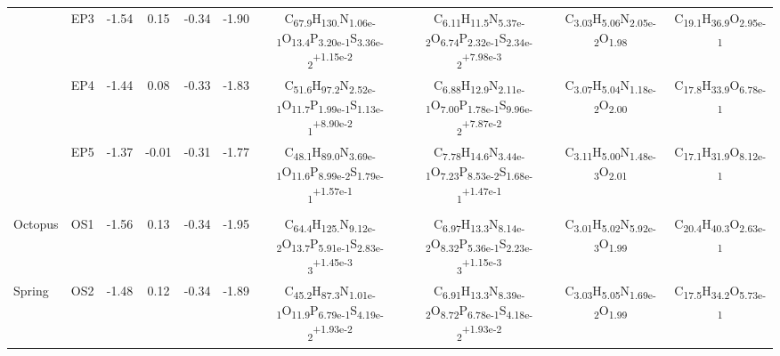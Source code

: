 {\begin{landscape}
\begin{table}
\begin{adjustbox}{width=600pt,keepaspectratio}
\begin{threeparttable}
\begin{tabular}{lccccccccc}
      & EP3   & -1.54 & 0.15  & -0.34 & -1.90 & C\textsubscript{67.9}H\textsubscript{130.}N\textsubscript{1.06e-1}O\textsubscript{13.4}P\textsubscript{3.20e-1}S\textsubscript{3.36e-2}\textsuperscript{+1.15e-2} & C\textsubscript{6.11}H\textsubscript{11.5}N\textsubscript{5.37e-2}O\textsubscript{6.74}P\textsubscript{2.32e-1}S\textsubscript{2.34e-2}\textsuperscript{+7.98e-3} & C\textsubscript{3.03}H\textsubscript{5.06}N\textsubscript{2.05e-2}O\textsubscript{1.98} & C\textsubscript{19.1}H\textsubscript{36.9}O\textsubscript{2.95e-1} \\
      & EP4   & -1.44 & 0.08  & -0.33 & -1.83 & C\textsubscript{51.6}H\textsubscript{97.2}N\textsubscript{2.52e-1}O\textsubscript{11.7}P\textsubscript{1.99e-1}S\textsubscript{1.13e-1}\textsuperscript{+8.90e-2} & C\textsubscript{6.88}H\textsubscript{12.9}N\textsubscript{2.11e-1}O\textsubscript{7.00}P\textsubscript{1.78e-1}S\textsubscript{9.96e-2}\textsuperscript{+7.87e-2} & C\textsubscript{3.07}H\textsubscript{5.04}N\textsubscript{1.18e-2}O\textsubscript{2.00} & C\textsubscript{17.8}H\textsubscript{33.9}O\textsubscript{6.78e-1} \\
      & EP5   & -1.37 & -0.01 & -0.31 & -1.77 & C\textsubscript{48.1}H\textsubscript{89.0}N\textsubscript{3.69e-1}O\textsubscript{11.6}P\textsubscript{8.99e-2}S\textsubscript{1.79e-1}\textsuperscript{+1.57e-1} & C\textsubscript{7.78}H\textsubscript{14.6}N\textsubscript{3.44e-1}O\textsubscript{7.23}P\textsubscript{8.53e-2}S\textsubscript{1.68e-1}\textsuperscript{+1.47e-1} & C\textsubscript{3.11}H\textsubscript{5.00}N\textsubscript{1.48e-3}O\textsubscript{2.01} & C\textsubscript{17.1}H\textsubscript{31.9}O\textsubscript{8.12e-1} \\
      &       &       &       &       &       &       &       &       &  \\
Octopus & OS1   & -1.56 & 0.13  & -0.34 & -1.95 & C\textsubscript{64.4}H\textsubscript{125.}N\textsubscript{9.12e-2}O\textsubscript{13.7}P\textsubscript{5.91e-1}S\textsubscript{2.83e-3}\textsuperscript{+1.45e-3} & C\textsubscript{6.97}H\textsubscript{13.3}N\textsubscript{8.14e-2}O\textsubscript{8.32}P\textsubscript{5.36e-1}S\textsubscript{2.23e-3}\textsuperscript{+1.15e-3} & C\textsubscript{3.01}H\textsubscript{5.02}N\textsubscript{5.92e-3}O\textsubscript{1.99} & C\textsubscript{20.4}H\textsubscript{40.3}O\textsubscript{2.63e-1} \\
Spring & OS2   & -1.48 & 0.12  & -0.34 & -1.89 & C\textsubscript{45.2}H\textsubscript{87.3}N\textsubscript{1.01e-1}O\textsubscript{11.9}P\textsubscript{6.79e-1}S\textsubscript{4.19e-2}\textsuperscript{+1.93e-2} & C\textsubscript{6.91}H\textsubscript{13.3}N\textsubscript{8.39e-2}O\textsubscript{8.72}P\textsubscript{6.78e-1}S\textsubscript{4.18e-2}\textsuperscript{+1.93e-2} & C\textsubscript{3.03}H\textsubscript{5.05}N\textsubscript{1.69e-2}O\textsubscript{1.99} & C\textsubscript{17.5}H\textsubscript{34.2}O\textsubscript{5.73e-1} \\
\bottomrule
\end{tabular}%



\end{threeparttable}
\end{adjustbox}
\end{table}
\end{landscape}}
